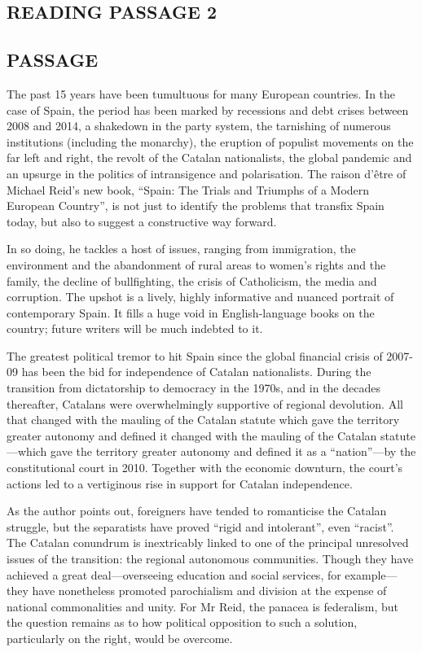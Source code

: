 \documentclass[10pt, a4paper, oneside]{article}
\begin{document}
\begin{spacing}{2.0}
\section{READING PASSAGE 2}
\subsection{PASSAGE}
The past 15 years have been tumultuous for many European countries. In the case of Spain, the period
has been marked by recessions and debt crises between 2008 and 2014, a shakedown in the party system, 
the tarnishing of numerous institutions (including the monarchy), the eruption of populist movements on the far left and right, 
the revolt of the Catalan nationalists, the global pandemic and an upsurge in the politics of intransigence and polarisation. 
The raison d'être of Michael Reid's new book, “Spain: The Trials and Triumphs of a Modern European Country”, 
is not just to identify the problems that transfix Spain today, but also to suggest a constructive way forward.

In so doing, he tackles a host of issues, ranging from immigration, the environment and the abandonment
of rural areas to women's rights and the family, the decline of bullfighting, the crisis of Catholicism, 
the media and corruption. The upshot is a lively, highly informative and nuanced portrait of contemporary
Spain. It fills a huge void in English-language books on the country; future writers will be much indebted to it.

The greatest political tremor to hit Spain since the global financial crisis of 2007-09 has been the bid for 
independence of Catalan nationalists. During the transition from dictatorship to democracy in the 1970s, 
and in the decades thereafter, Catalans were overwhelmingly supportive of regional devolution. 
All that changed with the mauling of the Catalan statute which gave the territory greater autonomy and defined 
it changed with the mauling of the Catalan statute—which gave the territory greater autonomy and defined it as a 
“nation”—by the constitutional court in 2010. Together with the economic downturn, the court's
actions led to a vertiginous rise in support for Catalan independence.

As the author points out, foreigners have tended to romanticise the Catalan struggle, but the separatists
have proved “rigid and intolerant”, even “racist”. The Catalan conundrum is inextricably linked to one of the principal 
unresolved issues of the transition: the regional autonomous communities. Though they have
achieved a great deal—overseeing education and social services, for example—they have nonetheless promoted parochialism 
and division at the expense of national commonalities and unity. For Mr Reid, the panacea is federalism, but the question 
remains as to how political opposition to such a solution, particularly on the right, would be overcome. 


\end{spacing}
\end{document}
